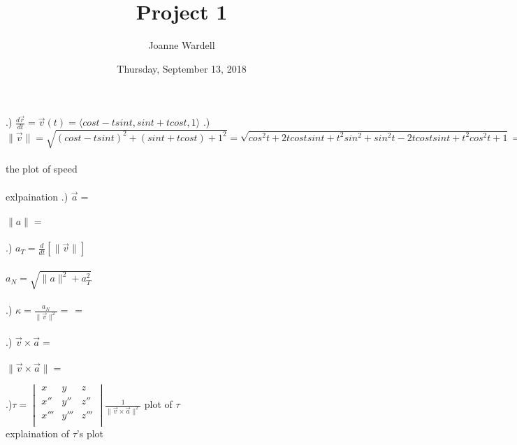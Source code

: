 \documentclass[12pt]{article}
\title{\vspace{-2.0cm}Project 1}
\author{Joanne Wardell}
\date{Thursday, September 13, 2018}
\begin{document}
\maketitle
{}.) $\frac{d\vec{r}}{dt} = \vec{v}(t) = \langle cos{t} -tsin{t}, sin{t} + tcos{t}, 1\rangle$
.) $\| \vec{v}\|  = \sqrt{(cos{t} - tsin{t})^{2} + (sin{t} + tcos{t}) + 1^{2}}
 = \sqrt{cos^{2}{t} + 2tcos{t}sin{t} + t^{2}sin^{2} + sin^{2}{t} -2tcos{t}sin{t} + t^{2}cos^{2}{t} + 1} 
 = \sqrt{t^{2} + 2}$\\\\
\noindent the plot of speed\\\\
\noindent exlpaination
.) $\vec{a} = $\\\\
\noindent $\| a \| = $\\\\
.) $a_{T} = \frac{d}{dt}[\| \vec{v} \|]$\\\\
\noindent $a_{N} = \sqrt{\| a \| ^{2} + a_{T}^{2}}$\\\\
.) $\kappa = \frac{a_{N}}{\| \vec{v} \| ^{2}} = \frac{}{} = $\\\\
.)  $\vec{v} \times \vec{a} = $\\\\
\noindent $\| \vec{v} \times \vec{a} \| = $

.)$\tau = \begin{vmatrix}
      x    &  y   &z \\ 
      x''  &  y'' &z'' \\
      x''' &  y'''&z''' \\ 
\end{vmatrix}
\frac{1}{\| \vec{v} \times \vec{a}\|^{2}}$
\noindent plot of $\tau$\\
\noindent explaination of $\tau$'s plot
\end{document}
